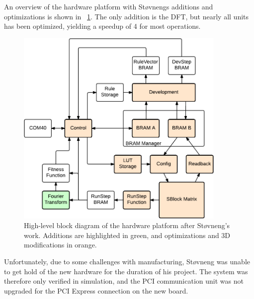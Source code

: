 An overview of the hardware platform with Støvnengs additions and optimizations is shown in \figurename~\ref{fig:overview-stovneng}.
The only addition is the DFT, but nearly all units has been optimized, yielding a speedup of 4 for most operations.

\begin{figure}[!ht]
    \centering
    \includegraphics[width=0.9\textwidth]{figures/overview-stovneng}
    \caption[High-level block diagram of Støvneng's hardware platform.]{
        High-level block diagram of the hardware platform after Støvneng's work.
        Additions are highlighted in green, and optimizations and 3D modifications in orange.
    }
    \label{fig:overview-stovneng}
\end{figure}

Unfortunately, due to some challenges with manufacturing, Støvneng was unable to get hold of the new hardware for the duration of his project.
The system was therefore only verified in simulation, and the PCI communication unit was not upgraded for the PCI Express connection on the new board.


